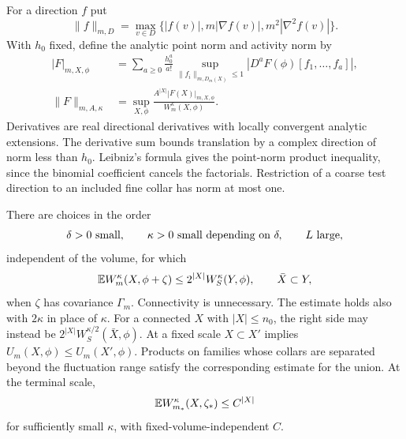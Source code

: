 For a direction $f$ put
\[
 \|f\|_{m,D}=\max_{v\in D}\{|f(v)|,m|\nabla f(v)|,m^2|\nabla^2f(v)|\}.
\]
With $h_0$ fixed, define the analytic point norm and activity norm by
\begin{equation}\label{rg:analytic-norm}
 \begin{aligned}
 |F|_{m,X,\phi}&=\sum_{a\ge0}\frac{h_0^a}{a!}
 \sup_{\|f_i\|_{m,D_m(X)}\le1}|D^aF(\phi)[f_1,\ldots,f_a]|,\\
 \|F\|_{m,A,\kappa}&=\sup_{X,\phi}
 \frac{A^{|X|}|F(X)|_{m,X,\phi}}{W_m^\kappa(X,\phi)}.
 \end{aligned}
\end{equation}
Derivatives are real directional derivatives with locally convergent analytic extensions.  The derivative sum bounds translation by a complex direction of norm less than $h_0$.  Leibniz's formula gives the point-norm product inequality, since the binomial coefficient cancels the factorials.  Restriction of a coarse test direction to an included fine collar has norm at most one.

\begin{lemma}\label{rg:regulator}
There are choices in the order
\begin{equation}\label{rg:choice-order}
 \delta>0\ \hbox{small},\qquad \kappa>0\ \hbox{small depending on }\delta,
 \qquad L\ \hbox{large},
\end{equation}
independent of the volume, for which
\begin{equation}\label{rg:reg-stability}
 \mathbb E W_m^\kappa(X,\phi+\zeta)\le2^{|X|}W_S^\kappa(Y,\phi),\qquad \bar X\subset Y,
\end{equation}
when $\zeta$ has covariance $\Gamma_m$.  Connectivity is unnecessary.  The estimate holds also with $2\kappa$ in place of $\kappa$.  For a connected $X$ with $|X|\le n_0$, the right side may instead be $2^{|X|}W_S^{\kappa/2}(\bar X,\phi)$.  At a fixed scale $X\subset X'$ implies $U_m(X,\phi)\le U_m(X',\phi)$.  Products on families whose collars are separated beyond the fluctuation range satisfy the corresponding estimate for the union.  At the terminal scale,
\begin{equation}\label{rg:terminal-reg}
 \mathbb E W_{m_*}^\kappa(X,\zeta_*)\le C^{|X|}
\end{equation}
for sufficiently small $\kappa$, with fixed-volume-independent $C$.
\end{lemma}

